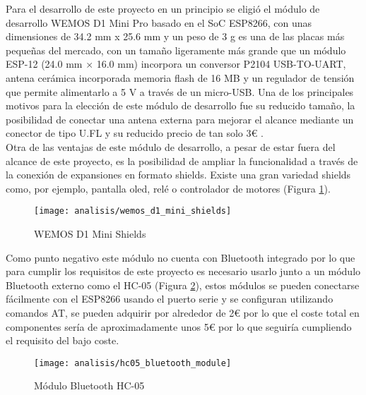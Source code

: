 \documentclass[../proyecto.tex]{subfiles}
\begin{document}
Para el desarrollo de este proyecto en un principio se eligió el módulo de desarrollo WEMOS D1 Mini Pro basado en el SoC ESP8266, con unas dimensiones de 34.2 mm x 25.6 mm y un peso de 3 g es una de las placas más pequeñas del mercado, con un tamaño ligeramente más grande que un módulo ESP-12 (24.0 mm × 16.0 mm) incorpora un conversor P2104 USB-TO-UART, antena cerámica incorporada memoria flash de 16 MB y un regulador de tensión que permite alimentarlo a 5 V a través de un micro-USB. Una de los principales motivos para la elección de este módulo de desarrollo fue su reducido tamaño, la posibilidad de conectar una antena externa para mejorar el alcance mediante un conector de tipo U.FL y su reducido precio de tan solo 3€ \cite{lolin_official_store}. \\

Otra de las ventajas de este módulo de desarrollo, a pesar de estar fuera del alcance de este proyecto, es la posibilidad de ampliar la funcionalidad a través de la conexión de expansiones en formato shields. Existe una gran variedad shields como, por ejemplo, pantalla oled, relé o controlador de motores (Figura \ref{fig:wemos_d1_mini_shields}).\\

\begin{figure}[H]
\centering
\texttt{[image: analisis/wemos\_d1\_mini\_shields]}
\caption{WEMOS D1 Mini Shields}
\label{fig:wemos_d1_mini_shields}
\end{figure}

Como punto negativo este módulo no cuenta con Bluetooth integrado por lo que para cumplir los requisitos de este proyecto es necesario usarlo junto a un módulo Bluetooth externo como el HC-05 (Figura \ref{fig:hc05_bluetooth_module}), estos módulos se pueden conectarse fácilmente con el ESP8266 usando el puerto serie y se configuran utilizando comandos AT, se pueden adquirir por alrededor de 2€ por lo que el coste total en componentes sería de aproximadamente unos 5€ por lo que seguiría cumpliendo el requisito del bajo coste.

\begin{figure}[H]
\centering
\texttt{[image: analisis/hc05\_bluetooth\_module]}
\caption{Módulo Bluetooth HC-05}
\label{fig:hc05_bluetooth_module}
\end{figure}
\end{document}
